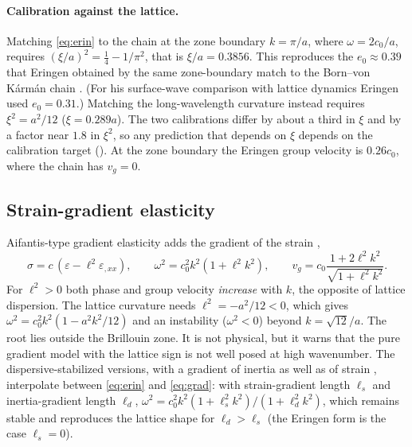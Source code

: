 \paragraph{Calibration against the lattice.} Matching \eqref{eq:erin} to the chain at the zone boundary $k=\pi/a$, where $\omega=2c_0/a$, requires $(\xi/a)^2=\tfrac14-1/\pi^2$, that is $\xi/a=0.3856$. This reproduces the $e_0\approx0.39$ that Eringen obtained by the same zone-boundary match to the Born--von K\'arm\'an chain \citep{Eringen1983}. (For his surface-wave comparison with lattice dynamics Eringen used $e_0=0.31$.) Matching the long-wavelength curvature instead requires $\xi^2=a^2/12$ ($\xi=0.289a$). The two calibrations differ by about a third in $\xi$ and by a factor near $1.8$ in $\xi^2$, so any prediction that depends on $\xi$ depends on the calibration target (). At the zone boundary the Eringen group velocity is $0.26c_0$, where the chain has $v_g=0$.

\subsection{Strain-gradient elasticity}
Aifantis-type gradient elasticity adds the gradient of the strain \citep{Aifantis1992,Aifantis2003},
\begin{equation}
\sigma=c\,(\varepsilon-\ell^2\varepsilon_{,xx}),\qquad \omega^2=c_0^2k^2(1+\ell^2k^2),\qquad v_g=c_0\frac{1+2\ell^2k^2}{\sqrt{1+\ell^2k^2}}.\label{eq:grad}
\end{equation}
For $\ell^2>0$ both phase and group velocity \emph{increase} with $k$, the opposite of lattice dispersion. The lattice curvature needs $\ell^2=-a^2/12<0$, which gives $\omega^2=c_0^2k^2(1-a^2k^2/12)$ and an instability ($\omega^2<0$) beyond $k=\sqrt{12}/a$. The root lies outside the Brillouin zone. It is not physical, but it warns that the pure gradient model with the lattice sign is not well posed at high wavenumber. The dispersive-stabilized versions, with a gradient of inertia as well as of strain \citep{Askes2006,Askes2011}, interpolate between \eqref{eq:erin} and \eqref{eq:grad}: with strain-gradient length $\ell_s$ and inertia-gradient length $\ell_d$, $\omega^2=c_0^2k^2(1+\ell_s^2k^2)/(1+\ell_d^2k^2)$, which remains stable and reproduces the lattice shape for $\ell_d>\ell_s$ (the Eringen form is the case $\ell_s=0$).


